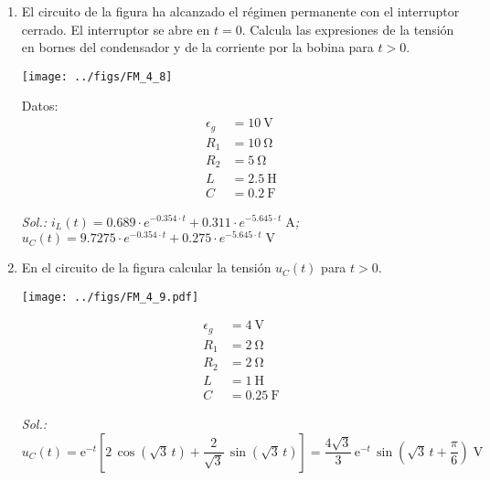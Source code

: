 \begin{enumerate}
\item El circuito de la figura ha alcanzado el régimen permanente con
  el interruptor cerrado. El interruptor se abre en $t = 0$. Calcula
  las expresiones de la tensión en bornes del condensador y de la
  corriente por la bobina para $t > 0$.

  \vspace{2mm}

\begin{minipage}{0.7\textwidth}
  \texttt{[image: ../figs/FM\_4\_8]}
\end{minipage}
\hfill
\begin{minipage}{0.3\textwidth}
  Datos:
  \begin{align*}
    \epsilon_g &= \SI{10}{\volt}\\
    R_1 &= \SI{10}{\ohm}\\
    R_2 &= \SI{5}{\ohm}\\
    L &= \SI{2.5}{\henry}\\
    C &= \SI{0.2}{\farad}      
  \end{align*}
\end{minipage}

\vspace{2mm}
\emph{Sol.:\; $i_L(t) = 0.689 \cdot e^{-0.354 \cdot t} + 0.311 \cdot e^{-5.645 \cdot t} \;\si{\ampere}$;\;
$u_C(t) = 9.7275 \cdot e^{-0.354 \cdot t} + 0.275 \cdot e^{-5.645 \cdot t} \;\si{\volt}$}

\item En el circuito de la figura calcular la tensión $u_C(t)$ para
  $t > 0$.

  \begin{minipage}{0.5\linewidth}
    \begin{center}
      \texttt{[image: ../figs/FM\_4\_9.pdf]}
    \end{center}
  \end{minipage}
  \begin{minipage}{0.5\linewidth}

  \begin{align*}
    \epsilon_g &= \SI{4}{\volt}\\
    R_1 &= \SI{2}{\ohm}\\
    R_2 &= \SI{2}{\ohm}\\
    L &= \SI{1}{\henry}\\
    C &= \SI{0.25}{\farad}      
  \end{align*}
  \end{minipage}

  \emph{Sol.:\;
    $u_C(t)=
    \mathrm{e}^{-t}\left[2\,\cos(\sqrt{3}\,t)+\dfrac{2}{\sqrt{3}}\,\sin(\sqrt{3}\,t)\right]=\dfrac{4\sqrt{3}}{3}\,\mathrm{e}^{-t}\,\sin\left(\sqrt{3}\,t+\dfrac{\pi}{6}\right) \;\si{\volt}$
    }


\end{enumerate}
